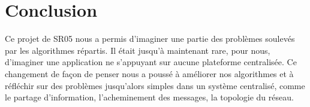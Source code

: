 
\section{Conclusion}

Ce projet de SR05 nous a permis d'imaginer une partie des problèmes soulevés par les algorithmes répartis. Il était jusqu'à maintenant rare, pour nous, d'imaginer une application ne s'appuyant sur aucune plateforme centralisée. Ce changement de façon de penser nous a poussé à améliorer nos algorithmes et à réfléchir sur des problèmes jusqu'alors simples dans un système centralisé, comme le partage d'information, l'acheminement des messages, la topologie du réseau.

